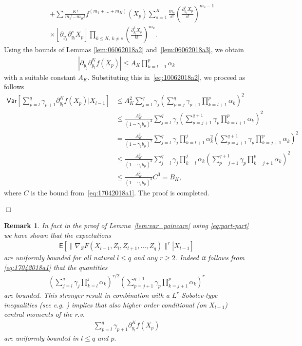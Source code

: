 \documentclass[preprint]{imsart}
\newcommand{\proofendsign}{$\Box$}
\newtheorem{remark}{Remark}
\newenvironment{proof}{{\noindent \bf Proof }}
 {{\hspace*{\fill}\proofendsign\par\bigskip}}
\begin{document}
\begin{proof}
\begin{eqnarray*}
&&+\sum\frac{K!}{m_{1}!\ldots m_{K}!}f^{(m_{1}+\ldots+m_{K})}(X_{p})
\sum_{s=1}^{K}\frac{m_{s}}{s!}
\left(\frac{\partial_{y_{l}}^{s}X_{p}}{s!}\right)^{m_{s}-1}
\\
&& \times\left[\partial_{y_{j}}\partial_{y_{l}}^{s}X_{p}\right]
\prod_{k\le K,\,k\neq s}\left(\frac{\partial_{y_{l}}^{k}X_{p}}{k!}\right)^{m_{k}}.
\end{eqnarray*}
Using the bounds of
Lemmas \ref{lem:06062018a2} and~\ref{lem:06062018a3},
we obtain
\begin{eqnarray}
\label{eq:part-part}
\left|\partial_{y_{j}}\partial_{y_{l}}^{K}f\left(X_{p}\right)\right|
\leq A_{K}\prod_{k=l+1}^{p}\alpha_{k}
\end{eqnarray}
with a suitable constant $A_{K}$.
Substituting this in~\eqref{eq:10062018a2},
we proceed as follows
\begin{align*}
\mathsf{Var}\left[\sum_{p=l}^{q}\gamma_{p+1}\partial_{y_{l}}^{K}f\left(X_{p}\right)\Big|X_{l-1}\right]
&\le
A_{K}^{2}\sum_{j=l}^{q}\gamma_{j}
\left(\sum_{p=j}^{q}\gamma_{p+1}\prod_{k=l+1}^{p}\alpha_{k}\right)^{2}
\\
&\le
\frac{A_{K}^{2}}{(1-\gamma_1 b_\mu)^2}
\sum_{j=l}^{q} \gamma_{j}
\left(
\sum_{p=j+1}^{q+1} \gamma_{p} \prod_{k=l+1}^{p} \alpha_{k}
\right)^{2}
\\
&=
\frac{A_{K}^{2}}{(1-\gamma_1 b_\mu)^2}
\sum_{j=l}^{q} \gamma_{j}
\prod_{k=l+1}^{j} \alpha_{k}^2
\left(
\sum_{p=j+1}^{q+1} \gamma_{p} \prod_{k=j+1}^{p} \alpha_{k}
\right)^{2}
\\
&\le
\frac{A_{K}^{2}}{(1-\gamma_1 b_\mu)^3}
\sum_{j=l}^{q} \gamma_{j}
\prod_{k=l}^{j} \alpha_{k}
\left(
\sum_{p=j+1}^{q+1} \gamma_{p} \prod_{k=j+1}^{p} \alpha_{k}
\right)^{2}
\\
&\le
\frac{A_{K}^{2}}{(1-\gamma_1 b_\mu)^3}C^3=B_K,
\end{align*}
where $C$ is the bound from~\eqref{eq:17042018a1}.
The proof is completed.
\end{proof}
\begin{remark}\label{rem:p-norm}
In fact in the proof of Lemma~\ref{lem:var_poincare} using \eqref{eq:part-part} we have shown that the expectations
\begin{eqnarray*}
\mathsf E\left[\left.
\|\nabla_Z F(X_{l-1},Z_l,Z_{l+1},\ldots,Z_q)\|^r
\right|X_{l-1}\right]
\end{eqnarray*}
are uniformly bounded for all natural \(l\leq q\) and any \(r\geq 2.\) Indeed it follows from \eqref{eq:17042018a1} that  the quantities
\begin{eqnarray*}
\left(\sum_{j=l}^{q} \gamma_{j}
\prod_{k=l}^{j} \alpha_{k}\right)^{r/2}
\left(
\sum_{p=j+1}^{q+1} \gamma_{p} \prod_{k=j+1}^{p} \alpha_{k}
\right)^{r}
\end{eqnarray*}
are bounded. This stronger result in combination with a \(L^r\)-Sobolev-type inequalities (see e.g. \cite{Adamczak}) implies that also higher order conditional (on \(X_{l-1}\)) central moments of the r.v. 
\begin{eqnarray*}
\sum_{p=l}^{q}\gamma_{p+1}\partial_{y_{l}}^{K}f\left(X_{p}\right)
\end{eqnarray*}
are uniformly bounded in \(l\leq q\) and \(p.\) 

\end{remark}
\end{document}
